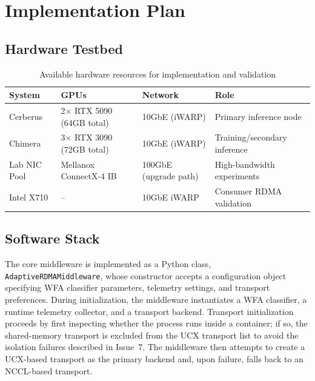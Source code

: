 \documentclass[11pt,letterpaper]{article}
\theoremstyle{definition}
\begin{document}
\section{Implementation Plan}

\subsection{Hardware Testbed}

\begin{table}[htbp]
\centering
\caption{Available hardware resources for implementation and validation}
\label{tab:hardware}
\begin{tabular}{@{}llll@{}}
\toprule
\textbf{System} & \textbf{GPUs} & \textbf{Network} & \textbf{Role} \\
\midrule
Cerberus & 2$\times$ RTX 5090 (64GB total) & 10GbE (iWARP) & Primary inference node \\
Chimera & 3$\times$ RTX 3090 (72GB total) & 10GbE (iWARP) & Training/secondary inference \\
Lab NIC Pool & Mellanox ConnectX-4 IB & 100GbE (upgrade path) & High-bandwidth experiments \\
Intel X710 & -- & 10GbE iWARP & Consumer RDMA validation \\
\bottomrule
\end{tabular}
\end{table}

\subsection{Software Stack}

The core middleware is implemented as a Python class, \texttt{AdaptiveRDMAMiddleware}, whose constructor accepts a configuration object specifying WFA classifier parameters, telemetry settings, and transport preferences.
During initialization, the middleware instantiates a WFA classifier, a runtime telemetry collector, and a transport backend.
Transport initialization proceeds by first inspecting whether the process runs inside a container; if so, the shared-memory transport is excluded from the UCX transport list to avoid the isolation failures described in Issue~7.
The middleware then attempts to create a UCX-based transport as the primary backend and, upon failure, falls back to an NCCL-based transport.
\end{document}
